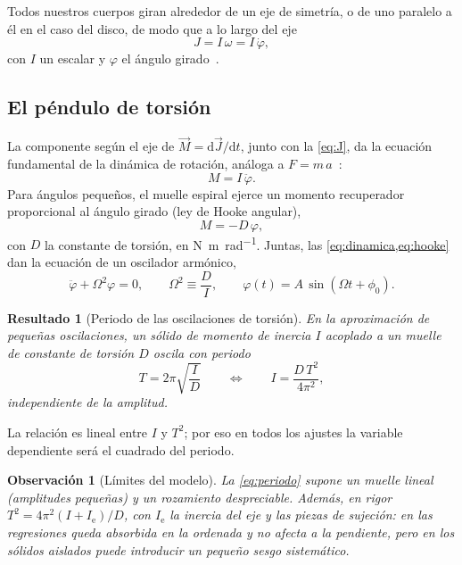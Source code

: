 \documentclass[a4paper,11pt]{amsart}
\numberwithin{equation}{section}
\newcommand{\Ie}{I_{\mathrm{e}}}              %
\newcommand{\dif}{\mathrm{d}}
\newcommand{\vect}[1]{\vec{#1}}
\theoremstyle{cienplano}
\newtheorem{resultado}[proposicion]{Resultado}
\theoremstyle{ciendef}
\theoremstyle{cienobs}
\newtheorem{observacion}[proposicion]{Observación}
\begin{document}
Todos nuestros cuerpos giran alrededor de un eje de simetría, o de uno
paralelo a él en el caso del disco, de modo que a lo largo del eje
\begin{equation}\label{eq:J}
  J=I\,\omega=I\,\dot{\varphi},
\end{equation}
con $I$ un escalar y $\varphi$ el ángulo girado~\cite{GUION-P1}.

\subsection{El péndulo de torsión}\label{sec:torsion}
La componente según el eje de $\vect{M}=\dif\vect{J}/\dif t$, junto con la
\cref{eq:J}, da la ecuación fundamental de la dinámica de rotación, análoga
a $F=m\,a$~\cite{FI-FAB,GUION-P1}:
\begin{equation}\label{eq:dinamica}
  M=I\,\ddot{\varphi}.
\end{equation}
Para ángulos pequeños, el muelle espiral ejerce un momento recuperador
proporcional al ángulo girado (ley de Hooke angular),
\begin{equation}\label{eq:hooke}
  M=-D\,\varphi,
\end{equation}
con $D$ la constante de torsión, en \si{\newton\meter\per\radian}. Juntas,
las \cref{eq:dinamica,eq:hooke} dan la ecuación de un oscilador armónico,
\begin{equation}\label{eq:oscilador}
  \ddot{\varphi}+\Omega^{2}\varphi=0,
  \qquad
  \Omega^{2}\equiv\frac{D}{I},
  \qquad
  \varphi(t)=A\,\sin(\Omega t+\phi_0).
\end{equation}

\begin{resultado}[Periodo de las oscilaciones de torsión]\label{res:periodo}
En la aproximación de pequeñas oscilaciones, un sólido de momento de inercia
$I$ acoplado a un muelle de constante de torsión $D$ oscila con periodo
\begin{equation}\label{eq:periodo}
  T=2\pi\sqrt{\frac{I}{D}}
  \qquad\Longleftrightarrow\qquad
  I=\frac{D\,T^{2}}{4\pi^{2}},
\end{equation}
independiente de la amplitud.
\end{resultado}

La relación es lineal entre $I$ y $T^{2}$; por eso en todos los ajustes la
variable dependiente será el cuadrado del periodo.

\begin{observacion}[Límites del modelo]\label{obs:modelo}
La \cref{eq:periodo} supone un muelle lineal (amplitudes pequeñas) y un
rozamiento despreciable. Además, en rigor $T^{2}=4\pi^{2}(I+\Ie)/D$, con
$\Ie$ la inercia del eje y las piezas de sujeción: en las regresiones queda
absorbida en la ordenada y no afecta a la pendiente, pero en los sólidos
aislados puede introducir un pequeño sesgo sistemático.
\end{observacion}
\end{document}
